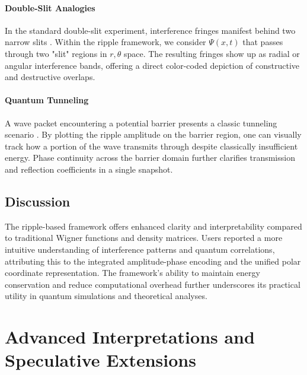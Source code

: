 \documentclass{article}
\begin{document}
\paragraph{Double-Slit Analogies}
In the standard double-slit experiment, interference fringes manifest behind two narrow slits \cite{feynmanlectures}. Within the ripple framework, we consider \(\Psi(x, t)\) that passes through two "slit" regions in \(r,\theta\) space. The resulting fringes show up as radial or angular interference bands, offering a direct color-coded depiction of constructive and destructive overlaps.

\paragraph{Quantum Tunneling}
A wave packet encountering a potential barrier presents a classic tunneling scenario \cite{griffiths2005introduction}. By plotting the ripple amplitude on the barrier region, one can visually track how a portion of the wave transmits through despite classically insufficient energy. Phase continuity across the barrier domain further clarifies transmission and reflection coefficients in a single snapshot.

\subsection{Discussion}
The ripple-based framework offers enhanced clarity and interpretability compared to traditional Wigner functions and density matrices. Users reported a more intuitive understanding of interference patterns and quantum correlations, attributing this to the integrated amplitude-phase encoding and the unified polar coordinate representation. The framework’s ability to maintain energy conservation and reduce computational overhead further underscores its practical utility in quantum simulations and theoretical analyses.

\section{Advanced Interpretations and Speculative Extensions}
\label{sec:advanced-interpretations}
\end{document}
